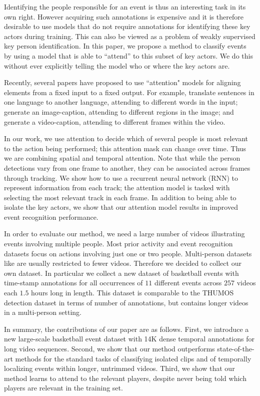 Identifying the people responsible for an event is thus an interesting task in its
own right.  However acquiring such annotations is expensive and it is therefore
desirable to use models that do not require
annotations for identifying these key actors during training. This can
also be viewed as a problem of weakly supervised key person identification. In
this paper, we propose a method  to classify events by using a model that is
able to ``attend'' to this subset of key actors.  We  do this without ever
explicitly telling the model who or where the key actors are.

Recently, several papers have proposed to use ``attention" models for aligning
elements from a fixed input to a fixed output.  For example,
\cite{Bahdnau_arxiv14} translate sentences in one language to another language,
attending to different words in the input; \cite{Xu_arxiv15} generate an image-caption,
attending to different regions in the image; and
\cite{Yao_arxiv15} generate a video-caption, attending to different
frames within the video.


In our work, we use attention to decide which of several people is most
relevant to the action being performed; this attention mask can change over
time. Thus we are combining spatial and temporal attention.  Note that while
the person detections vary from one frame to another, they can be associated
across frames through tracking. We show how to use a recurrent neural
network (RNN) to represent information from each track;
the attention model is tasked with selecting the most relevant
track in each frame. In addition to being able to isolate the key actors,
we show that our attention model results in improved event recognition
performance.

In order to evaluate our method, we need a large number of videos illustrating
events involving multiple people. Most prior activity and event
recognition datasets focus on actions involving just one or two people.
Multi-person datasets like \cite{Ryoo_ICCV09,VIRAT,Choi_ICCV09} are usually restricted to fewer videos.
Therefore we decided to collect our own dataset.
In particular we collect a new dataset of basketball events with time-stamp annotations for
all occurrences of $11$ different events across $257$ videos each $1.5$ hours
long in length.  This dataset is comparable to the THUMOS \cite{THUMOS}
detection dataset in terms of number of annotations, but contains longer videos
in a multi-person setting.

In summary, the contributions of our paper are as follows.  First, we
introduce a new  large-scale basketball event dataset with 14K dense temporal
annotations for long video sequences.  Second, we show that our method
outperforms state-of-the-art methods for the standard tasks of classifying
isolated clips and of temporally localizing events within longer, untrimmed
videos.  Third, we show that our method learns to attend to the relevant
players, despite never being told which players are relevant in the training
set.

